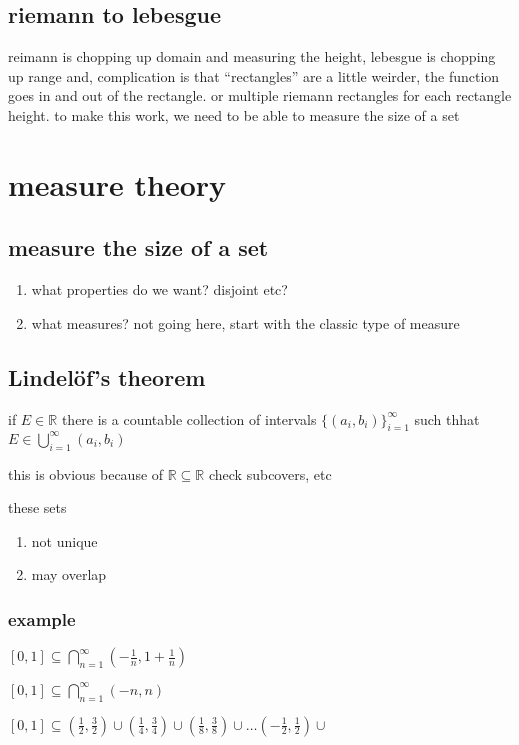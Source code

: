 \documentclass[letterpaper]{article}
\begin{document}
\subsection*{riemann to lebesgue}
reimann is chopping up  domain and measuring the height,
lebesgue is chopping up range and, complication is that ``rectangles'' are a little weirder, the function goes in and out of the rectangle. or multiple riemann rectangles for each rectangle height. to make this work, we need to be able to measure the size of a set

\section*{measure theory}
\subsection*{measure the size of a set}
\begin{enumerate}
\item
what properties do we want? disjoint etc?
\item
what measures? not going here, start with the classic type of measure
\end{enumerate}
\subsection*{Lindelöf's theorem}
if $E\in \mathbb{R}$ there is a countable collection of intervals $\{(a_i,b_i)\}_{i=1}^\infty$ such thhat $E\in \bigcup_{i=1}^\infty(a_i,b_i)$

this is obvious because of $\mathbb{R}\subseteq\mathbb{R}$ check subcovers, etc

these sets
\begin{enumerate}
\item
not unique
\item
may overlap
\end{enumerate}

\subsubsection*{example}
$[0,1]\subseteq\bigcap_{n=1}^\infty(-\frac{1}{n},1+\frac{1}{n})$

$[0,1]\subseteq\bigcap_{n=1}^\infty(-n,n)$

$[0,1]\subseteq(\frac{1}{2},\frac{3}{2})\cup(\frac{1}{4},\frac{3}{4})\cup(\frac{1}{8},\frac{3}{8})\cup\dots(-\frac{1}{2},\frac{1}{2})\cup$
\end{document}
